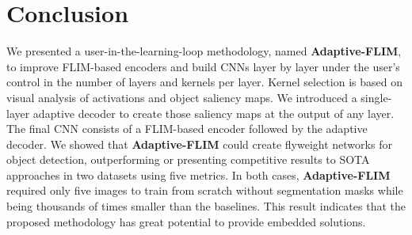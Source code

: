 \documentclass[10pt,twocolumn,twoside]{IEEEtran}
\begin{document}
\begin{table}[htb]
 \centering
    \caption{Comparison among the number of parameters of different models. The deep models presented are used in our comparisons, and the lightweight models are standard backbones used for object detection. Models with (*) indicate no manual kernel selection}
    \label{tab:model-sizes}
\end{table}

\section{Conclusion}\label{sec:conclusion}
    We presented a user-in-the-learning-loop methodology, named \textbf{Adaptive-FLIM}, to improve FLIM-based encoders and build CNNs layer by layer under the user's control in the number of layers and kernels per layer. Kernel selection is based on visual analysis of activations and object saliency maps. We introduced a single-layer adaptive decoder to create those saliency maps at the output of any layer. The final CNN consists of a FLIM-based encoder followed by the adaptive decoder. We showed that \textbf{Adaptive-FLIM} could create flyweight networks for object detection, outperforming or presenting competitive results to SOTA approaches in two datasets using five metrics. In both cases,  \textbf{Adaptive-FLIM}  required only five images to train from scratch without segmentation masks while being thousands of times smaller than the baselines. This result indicates that the proposed methodology has great potential to provide embedded solutions.  
    
\end{document}
